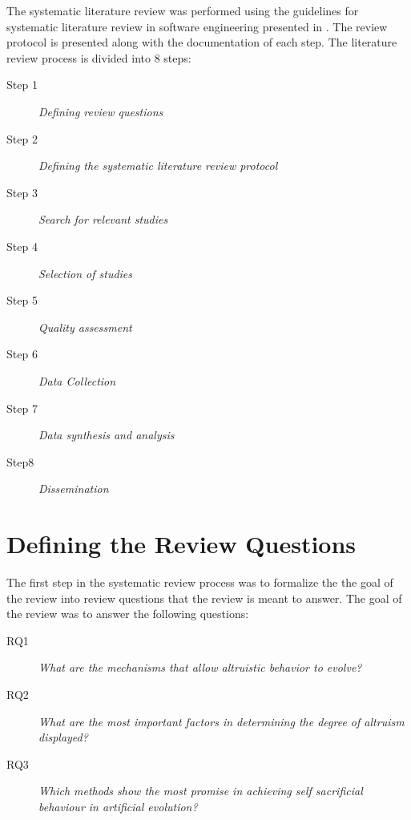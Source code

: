 \documentclass[a4paper]{book}
\begin{document}


The systematic literature review was performed using the guidelines for systematic 
literature review in software engineering presented in \cite{keele_guidelines_2007}.
The review protocol is presented along with the documentation of each step.
The literature review process is divided into 8 steps: %

\begin{description}
\item[Step 1] {\it Defining review questions}

\item[Step 2] {\it Defining the systematic literature review protocol}

\item[Step 3] {\it Search for relevant studies}

\item[Step 4] {\it Selection of studies}

\item[Step 5] {\it Quality assessment}

\item[Step 6] {\it Data Collection}

\item[Step 7] {\it Data synthesis and analysis}

\item[Step8] {\it Dissemination}

\end{description}

\clearpage 

\section{Defining the Review Questions}
The first step in the systematic review process was to formalize the the goal of the review into review questions that the review is meant to answer. The goal of the review was to answer the following questions:

\begin{description}
\item[RQ1] {\it What are the mechanisms that allow altruistic behavior to evolve?} 
\item[RQ2] {\it What are the most important factors in determining the degree of altruism displayed?}
\item[RQ3] {\it Which methods show the most promise in achieving self sacrificial behaviour in artificial evolution?}

\end{description}
\end{document}
